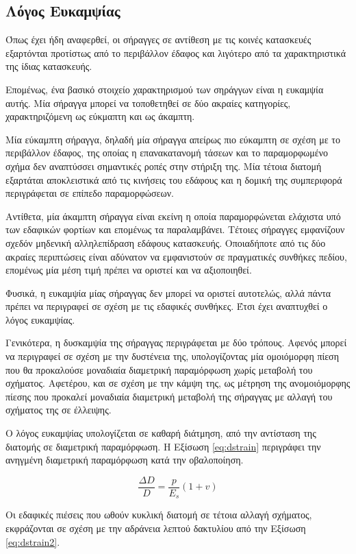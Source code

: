 \subsection{Λόγος Ευκαμψίας}
Όπως έχει ήδη αναφερθεί, οι σήραγγες σε αντίθεση με τις κοινές κατασκευές εξαρτόνται προτίστως από το περιβάλλον έδαφος και λιγότερο από τα χαρακτηριστικά της ίδιας κατασκευής.

Επομένως, ένα βασικό στοιχείο χαρακτηρισμού των σηράγγων είναι η ευκαμψία αυτής. Μία σήραγγα μπορεί να τοποθετηθεί σε δύο ακραίες κατηγορίες, χαρακτηριζόμενη ως εύκμαπτη και ως άκαμπτη.

Μία εύκαμπτη σήραγγα, δηλαδή μία σήραγγα απείρως πιο εύκαμπτη σε σχέση με το περιβάλλον έδαφος, της οποίας η επανακατανομή τάσεων και το παραμορφωμένο σχήμα δεν αναπτύσσει σημαντικές ροπές στην στήριξη της. Μία τέτοια διατομή εξαρτάται αποκλειστικά από τις κινήσεις του εδάφους και η δομική της συμπεριφορά περιγράφεται σε επίπεδο παραμορφώσεων.

Αντίθετα, μία άκαμπτη σήραγγα είναι εκείνη η οποία παραμορφώνεται ελάχιστα υπό των εδαφικών φορτίων και επομένως τα παραλαμβάνει. Τέτοιες σήραγγες εμφανίζουν σχεδόν μηδενική αλληλεπίδραση εδάφους κατασκευής. Οποιαδήποτε από τις δύο ακραίες περιπτώσεις είναι αδύνατον να εμφανιστούν σε πραγματικές συνθήκες πεδίου, επομένως μία μέση τιμή πρέπει να οριστεί και να αξιοποιηθεί.

Φυσικά, η ευκαμψία μίας σήραγγας δεν μπορεί να οριστεί αυτοτελώς, αλλά πάντα πρέπει να περιγραφεί σε σχέση με τις εδαφικές συνθήκες. Έτσι έχει αναπτυχθεί ο λόγος ευκαμψίας.

Γενικότερα, η δυσκαμψία της σήραγγας περιγράφεται με δύο τρόπους. Αφενός μπορεί να περιγραφεί σε σχέση με την δυστένεια της, υπολογίζοντας μία ομοιόμορφη πίεση που θα προκαλούσε μοναδιαία διαμετρική παραμόρφωση χωρίς μεταβολή του σχήματος. Αφετέρου, και σε σχέση με την κάμψη της, ως μέτρηση της ανομοιόμορφης πίεσης που προκαλεί μοναδιαία διαμετρική μεταβολή της σήραγγας με αλλαγή του σχήματος της σε έλλειψης.

Ο λόγος ευκαμψίας υπολογίζεται σε καθαρή διάτμηση, από την αντίσταση της διατομής σε διαμετρική παραμόρφωση. Η Εξίσωση \ref{eq:dstrain} περιγράφει την ανηγμένη διαμετρική παραμόρφωση κατά την οβαλοποίηση.

\begin{equation}
	\frac{\Delta D}{D} = \frac{p}{E_s}(1+v)
	\label{eq:dstrain}
\end{equation}

Οι εδαφικές πιέσεις που ωθούν κυκλική διατομή σε τέτοια αλλαγή σχήματος, εκφράζονται σε σχέση με την αδράνεια λεπτού δακτυλίου από την Εξίσωση \ref{eq:dstrain2}.

